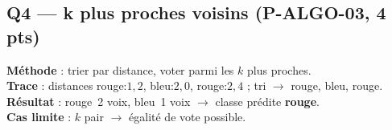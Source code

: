 \documentclass[a4paper,11pt]{article}
\begin{document}
\subsection*{Q4 — k plus proches voisins (P-ALGO-03, 4 pts)}
\textbf{Méthode} : trier par distance, voter parmi les $k$ plus proches.\\
\textbf{Trace} : distances rouge:$1{,}2$, bleu:$2{,}0$, rouge:$2{,}4$ ; tri $\rightarrow$ rouge, bleu, rouge.\\
\textbf{Résultat} : rouge~2 voix, bleu~1 voix $\rightarrow$ classe prédite \textbf{rouge}.\\
\textbf{Cas limite} : $k$ pair $\rightarrow$ égalité de vote possible.
\end{document}
